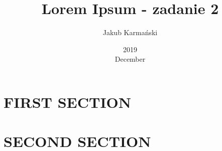 \documentclass[a4paper,11pt,twoside]{article}
\title{Lorem Ipsum - zadanie 2}
\date{2019\\ December}
\author{Jakub Karmański}
\begin{document}
\maketitle 
\thispagestyle{empty}


\newpage
\section{FIRST SECTION}
\lipsum[1-2]


\newpage
\section{SECOND SECTION}
\lipsum[3-5]


\newpage


 
\end{document}
